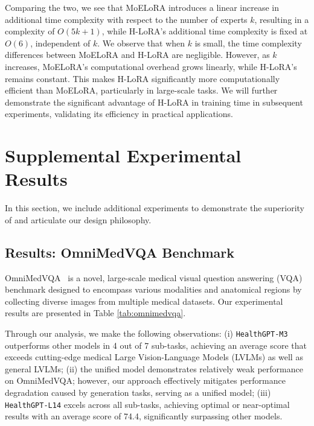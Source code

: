 Comparing the two, we see that MoELoRA introduces a linear increase in additional time complexity with respect to the number of experts $k$, resulting in a complexity of $O(5k + 1)$, while H-LoRA’s additional time complexity is fixed at $O(6)$, independent of $k$. We observe that when $k$ is small, the time complexity differences between MoELoRA and H-LoRA are negligible. However, as $k$ increases, MoELoRA’s computational overhead grows linearly, while H-LoRA’s remains constant. This makes H-LoRA significantly more computationally efficient than MoELoRA, particularly in large-scale tasks. We will further demonstrate the significant advantage of H-LoRA in training time in subsequent experiments, validating its efficiency in practical applications.

\section{Supplemental Experimental Results}
In this section, we include additional experiments to demonstrate the superiority of \ourmethod{} and articulate our design philosophy.

\subsection{Results: OmniMedVQA Benchmark} OmniMedVQA~\cite{hu2024omnimedvqa} is a novel, large-scale medical visual question answering (VQA) benchmark designed to encompass various modalities and anatomical regions by collecting diverse images from multiple medical datasets. Our experimental results are presented in Table \ref{tab:omnimedvqa}.



Through our analysis, we make the following observations: (i) \texttt{HealthGPT-M3} outperforms other models in 4 out of 7 sub-tasks, achieving an average score that exceeds cutting-edge medical Large Vision-Language Models (LVLMs) as well as general LVLMs; (ii) the unified model demonstrates relatively weak performance on OmniMedVQA; however, our approach effectively mitigates performance degradation caused by generation tasks, serving as a unified model; (iii) \texttt{HealthGPT-L14} excels across all sub-tasks, achieving optimal or near-optimal results with an average score of 74.4, significantly surpassing other models.



